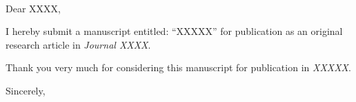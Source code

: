 \documentclass[11pt]{letter}
\begin{document}
\begin{letter}{~} 

\signature{Jane Doe} 

\opening{Dear XXXX,} 

I hereby submit a manuscript entitled: ``XXXXX'' for publication as an original
research article in \textit{Journal XXXX}. 

\lipsum[1-2]

Thank you very much for considering this manuscript for publication in
\textit{XXXXX}.

\closing{Sincerely,}

\end{letter}
\end{document}
